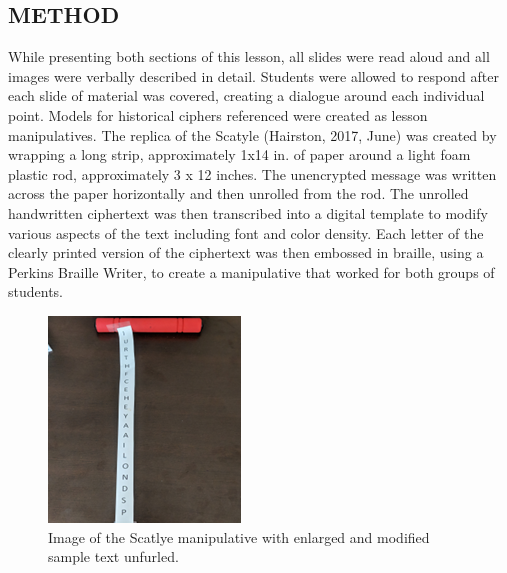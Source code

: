 \documentclass[11.5pt]{sig-alternate} %
\begin{document}
\begin{large}
\section*{METHOD}

While presenting both sections of this lesson, all slides were read aloud and all images were verbally described in detail. Students were allowed to respond after each slide of material was covered, creating a dialogue around each individual point.  Models for historical ciphers referenced were created as lesson manipulatives. The replica of the Scatyle (Hairston, 2017, June) was created by wrapping a long strip, approximately 1x14 in. of paper around a light foam plastic rod, approximately 3 x 12 inches. The unencrypted message was written across the paper horizontally and then unrolled from the rod. The unrolled handwritten ciphertext was then transcribed into a digital template to modify various aspects of the text including font and color density. Each letter of the clearly printed version of the ciphertext was then embossed in braille, using a Perkins Braille Writer, to create a manipulative that worked for both groups of students.

\begin{figure}[!h]
    \centering
    \includegraphics[width=1\linewidth]{images/fig1.png}
    \caption{Image of the Scatlye manipulative with enlarged and modified sample text unfurled.}
\end{figure}
 

\end{large}
\end{document}

